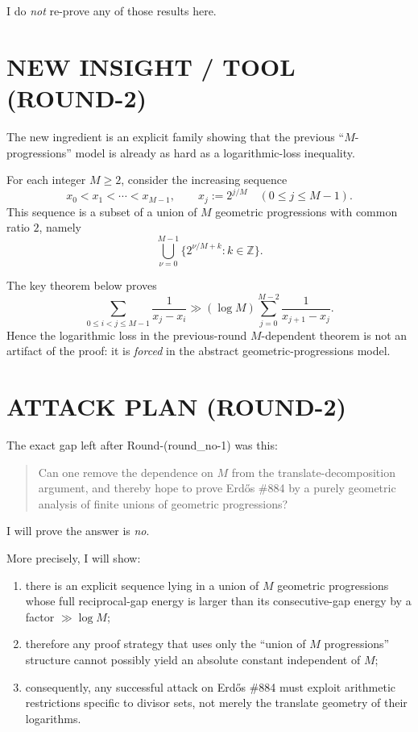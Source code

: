 I do \emph{not} re-prove any of those results here.

\section{NEW INSIGHT / TOOL (ROUND-2)}

The new ingredient is an explicit family showing that the previous ``\(M\)-progressions'' model is already as hard as a logarithmic-loss inequality.

For each integer \(M\ge 2\), consider the increasing sequence
\[
x_0<x_1<\cdots <x_{M-1},
\qquad
x_j:=2^{j/M} \quad (0\le j\le M-1).
\]
This sequence is a subset of a union of \(M\) geometric progressions with common ratio \(2\), namely
\[
\bigcup_{\nu=0}^{M-1} \{2^{\nu/M+k}: k\in \mathbb Z\}.
\]

The key theorem below proves
\[
\sum_{0\le i<j\le M-1}\frac1{x_j-x_i}
\gg (\log M)
\sum_{j=0}^{M-2}\frac1{x_{j+1}-x_j}.
\]
Hence the logarithmic loss in the previous-round \(M\)-dependent theorem is not an artifact of the proof: it is \emph{forced} in the abstract geometric-progressions model.

\section{ATTACK PLAN (ROUND-2)}

The exact gap left after Round-(round\_no-1) was this:

\begin{quote}
Can one remove the dependence on \(M\) from the translate-decomposition argument, and thereby hope to prove Erd\H{o}s \#884 by a purely geometric analysis of finite unions of geometric progressions?
\end{quote}

I will prove the answer is \emph{no}.

More precisely, I will show:

\begin{enumerate}
\item there is an explicit sequence lying in a union of \(M\) geometric progressions whose full reciprocal-gap energy is larger than its consecutive-gap energy by a factor \(\gg \log M\);
\item therefore any proof strategy that uses only the ``union of \(M\) progressions'' structure cannot possibly yield an absolute constant independent of \(M\);
\item consequently, any successful attack on Erd\H{o}s \#884 must exploit arithmetic restrictions specific to divisor sets, not merely the translate geometry of their logarithms.
\end{enumerate}

